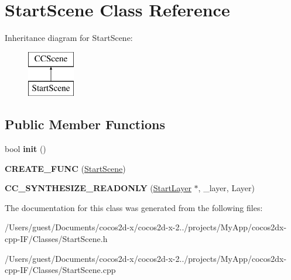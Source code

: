 \hypertarget{class_start_scene}{\section{Start\-Scene Class Reference}
\label{class_start_scene}
}
Inheritance diagram for Start\-Scene\-:\begin{figure}[H]
\begin{center}
\leavevmode
\includegraphics[height=2.000000cm]{class_start_scene}
\end{center}
\end{figure}
\subsection*{Public Member Functions}
\begin{DoxyCompactItemize}
\item 
\hypertarget{class_start_scene_aad0d90dc678c2602968367930d3834c2}{bool {\bfseries init} ()}\label{class_start_scene_aad0d90dc678c2602968367930d3834c2}

\item 
\hypertarget{class_start_scene_a9a6a7056b930a3892d3214b90188f367}{{\bfseries C\-R\-E\-A\-T\-E\-\_\-\-F\-U\-N\-C} (\hyperlink{class_start_scene}{Start\-Scene})}\label{class_start_scene_a9a6a7056b930a3892d3214b90188f367}

\item 
\hypertarget{class_start_scene_a18739b71d0229f04546c3bf8142ccf98}{{\bfseries C\-C\-\_\-\-S\-Y\-N\-T\-H\-E\-S\-I\-Z\-E\-\_\-\-R\-E\-A\-D\-O\-N\-L\-Y} (\hyperlink{class_start_layer}{Start\-Layer} $\ast$, \-\_\-layer, Layer)}\label{class_start_scene_a18739b71d0229f04546c3bf8142ccf98}

\end{DoxyCompactItemize}


The documentation for this class was generated from the following files\-:\begin{DoxyCompactItemize}
\item 
/\-Users/guest/\-Documents/cocos2d-\/x/cocos2d-\/x-\/2../projects/\-My\-App/cocos2dx-\/cpp-\/\-I\-F/\-Classes/Start\-Scene.\-h\item 
/\-Users/guest/\-Documents/cocos2d-\/x/cocos2d-\/x-\/2../projects/\-My\-App/cocos2dx-\/cpp-\/\-I\-F/\-Classes/Start\-Scene.\-cpp\end{DoxyCompactItemize}
